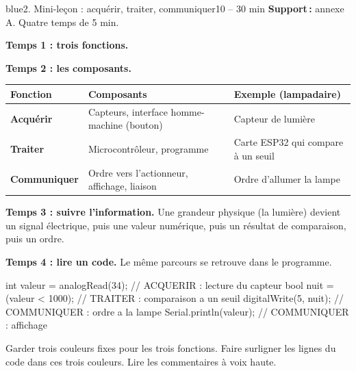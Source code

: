 \documentclass[11pt,a4paper]{article}
\begin{document}
\begin{etape}{blue}{2. Mini-leçon : acquérir, traiter, communiquer}{10 -- 30 min}
\textbf{Support\,:} annexe A. Quatre temps de 5 min.

\textbf{Temps 1 : trois fonctions.}
\begin{center}
\end{center}

\textbf{Temps 2 : les composants.}
\begin{center}
\begin{tabularx}{\linewidth}{>{\bfseries}p{2.8cm}Y Y}
\toprule
Fonction & Composants & Exemple (lampadaire)\\
\midrule
Acquérir & Capteurs, interface homme-machine (bouton) & Capteur de lumière\\
Traiter & Microcontrôleur, programme & Carte ESP32 qui compare à un seuil\\
Communiquer & Ordre vers l'actionneur, affichage, liaison & Ordre d'allumer la lampe\\
\bottomrule
\end{tabularx}
\end{center}

\textbf{Temps 3 : suivre l'information.} Une grandeur physique (la lumière) devient un signal électrique, puis une valeur numérique, puis un résultat de comparaison, puis un ordre.

\textbf{Temps 4 : lire un code.} Le même parcours se retrouve dans le programme.
\begin{arduino}
int valeur = analogRead(34);     // ACQUERIR : lecture du capteur
bool nuit = (valeur < 1000);     // TRAITER : comparaison a un seuil
digitalWrite(5, nuit);           // COMMUNIQUER : ordre a la lampe
Serial.println(valeur);          // COMMUNIQUER : affichage
\end{arduino}

\begin{astuce}
Garder trois couleurs fixes pour les trois fonctions. Faire surligner les lignes du code dans ces trois couleurs. Lire les commentaires à voix haute.
\end{astuce}
\end{etape}
\end{document}
